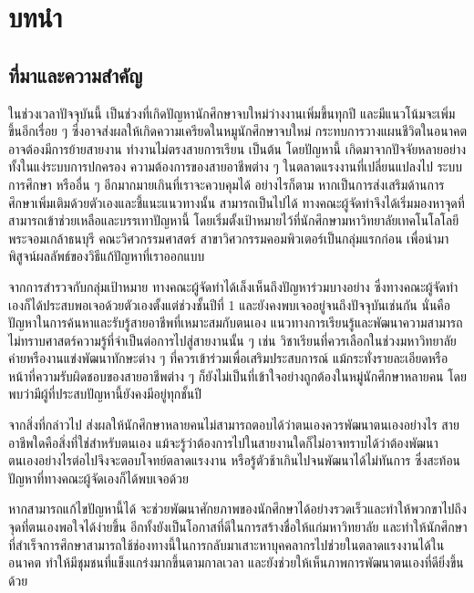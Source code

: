 \chapter{บทนำ}

\section{ที่มาและความสำคัญ}


ในช่วงเวลาปัจจุบันนี้ เป็นช่วงที่เกิดปัญหานักศึกษาจบใหม่ว่างงานเพิ่มขึ้นทุกปี \cite{hypersense} และมีแนวโน้มจะเพิ่มขึ้นอีกเรื่อย ๆ ซึ่งอาจส่งผลให้เกิดความเครียดในหมูนักศึกษาจบใหม่ กระทบการวางแผนชีวิตในอนาคต อาจต้องมีการย้ายสายงาน ทำงานไม่ตรงสายการเรียน เป็นต้น โดยปัญหานี้ เกิดมาจากปัจจัยหลายอย่างทั้งในแง่ระบบการปกครอง ความต้องการของสายอาชีพต่าง ๆ ในตลาดแรงงานที่เปลี่ยนแปลงไป ระบบการศึกษา หรืออื่น ๆ อีกมากมายเกินที่เราจะควบคุมได้ อย่างไรก็ตาม หากเป็นการส่งเสริมด้านการศึกษาเพิ่มเติมด้วยตัวเองและชี้แนะแนวทางนั้น สามารถเป็นไปได้ ทางคณะผู้จัดทำจึงได้เริ่มมองหาจุดที่สามารถเข้าช่วยเหลือและบรรเทาปัญหานี้ โดยเริ่มตั้งเป้าหมายไว้ที่นักศึกษามหาวิทยาลัยเทคโนโลโลยีพระจอมเกล้าธนบุรี คณะวิศวกรรมศาสตร์ สาขาวิศวกรรมคอมพิวเตอร์เป็นกลุ่มแรกก่อน เพื่อนำมาพิสูจน์ผลลัพธ์ของวิธีแก้ปัญหาที่เราออกแบบ

จากการสำรวจกับกลุ่มเป้าหมาย ทางคณะผู้จัดทำได้เล็งเห็นถึงปัญหาร่วมบางอย่าง ซึ่งทางคณะผู้จัดทำเองก็ได้ประสบพอเจอด้วยตัวเองตั้งแต่ช่วงชั้นปีที่ 1 และยังคงพบเจออยู่จนถึงปัจจุบันเช่นกัน นั่นคือปัญหาในการค้นหาและรับรู้สายอาชีพที่เหมาะสมกับตนเอง แนวทางการเรียนรู้และพัฒนาความสามารถ ไม่ทราบศาสตร์ความรู้ที่จำเป็นต่อการไปสู่สายงานนั้น ๆ เช่น วิชาเรียนที่ควรเลือกในช่วงมหาวิทยาลัย ค่ายหรืองานแข่งพัฒนาทักษะต่าง ๆ ที่ควรเข้าร่วมเพื่อเสริมประสบการณ์ แม้กระทั่งรายละเอียดหรือหน้าที่ความรับผิดชอบของสายอาชีพต่าง ๆ ก็ยังไม่เป็นที่เข้าใจอย่างถูกต้องในหมู่นักศึกษาหลายคน โดยพบว่ามีผู้ที่ประสบปัญหานี้ยังคงมีอยู่ทุกชั้นปี

จากสิ่งที่กล่าวไป ส่งผลให้นักศึกษาหลายคนไม่สามารถตอบได้ว่าตนเองควรพัฒนาตนเองอย่างไร สายอาชีพใดคือสิ่งที่ใช่สำหรับตนเอง แม้จะรู้ว่าต้องการไปในสายงานใดก็ไม่อาจทราบได้ว่าต้องพัฒนาตนเองอย่างไรต่อไปจึงจะตอบโจทย์ตลาดแรงงาน หรือรู้ตัวช้าเกินไปจนพัฒนาได้ไม่ทันการ ซึ่งสะท้อนปัญหาที่ทางคณะผู้จัดเองก็ได้พบเจอด้วย

หากสามารถแก้ไขปัญหานี้ได้ จะช่วยพัฒนาศักยภาพของนักศึกษาได้อย่างรวดเร็วและทำให้พวกขาไปถึงจุดที่ตนเองพอใจได้ง่ายขึ้น อีกทั้งยังเป็นโอกาสที่ดีในการสร้างชื่อให้แก่มหาวิทยาลัย และทำให้นักศึกษาที่สำเร็จการศึกษาสามารถใช้ช่องทางนี้ในการกลับมาเสาะหาบุคคลากรไปช่วยในตลาดแรงงานได้ในอนาคต ทำให้มีชุมชนที่แข็งแกร่งมากขึ้นตามกาลเวลา และยังช่วยให้เห็นภาพการพัฒนาตนเองที่ดียิ่งขึ้นด้วย

